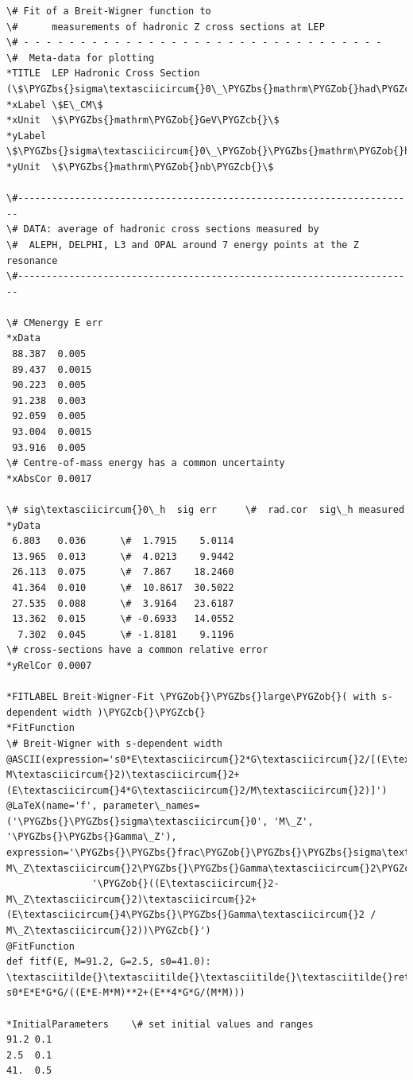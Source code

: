 \documentclass[a4paper,10pt,english]{sphinxmanual}
\def\PYGZbs{\char`\\}
\def\PYGZob{\char`\{}
\def\PYGZcb{\char`\}}
\begin{document}
\begin{Verbatim}[commandchars=\\\{\}]
\# Fit of a Breit-Wigner function to
\#      measurements of hadronic Z cross sections at LEP
\# - - - - - - - - - - - - - - - - - - - - - - - - - - - - - - - -
\#  Meta-data for plotting
*TITLE  LEP Hadronic Cross Section (\$\PYGZbs{}sigma\textasciicircum{}0\_\PYGZbs{}mathrm\PYGZob{}had\PYGZcb{}\$)
*xLabel \$E\_CM\$
*xUnit  \$\PYGZbs{}mathrm\PYGZob{}GeV\PYGZcb{}\$
*yLabel \$\PYGZbs{}sigma\textasciicircum{}0\_\PYGZob{}\PYGZbs{}mathrm\PYGZob{}had\PYGZcb{}\PYGZcb{}\$
*yUnit  \$\PYGZbs{}mathrm\PYGZob{}nb\PYGZcb{}\$

\#----------------------------------------------------------------------
\# DATA: average of hadronic cross sections measured by
\#  ALEPH, DELPHI, L3 and OPAL around 7 energy points at the Z resonance
\#----------------------------------------------------------------------

\# CMenergy E err
*xData
 88.387  0.005
 89.437  0.0015
 90.223  0.005
 91.238  0.003
 92.059  0.005
 93.004  0.0015
 93.916  0.005
\# Centre-of-mass energy has a common uncertainty
*xAbsCor 0.0017

\# sig\textasciicircum{}0\_h  sig err     \#  rad.cor  sig\_h measured
*yData
 6.803   0.036      \#  1.7915    5.0114
 13.965  0.013      \#  4.0213    9.9442
 26.113  0.075      \#  7.867    18.2460
 41.364  0.010      \#  10.8617  30.5022
 27.535  0.088      \#  3.9164   23.6187
 13.362  0.015      \# -0.6933   14.0552
  7.302  0.045      \# -1.8181    9.1196
\# cross-sections have a common relative error
*yRelCor 0.0007

*FITLABEL Breit-Wigner-Fit \PYGZob{}\PYGZbs{}large\PYGZob{}( with s-dependent width )\PYGZcb{}\PYGZcb{}
*FitFunction
\# Breit-Wigner with s-dependent width
@ASCII(expression='s0*E\textasciicircum{}2*G\textasciicircum{}2/[(E\textasciicircum{}2-M\textasciicircum{}2)\textasciicircum{}2+(E\textasciicircum{}4*G\textasciicircum{}2/M\textasciicircum{}2)]')
@LaTeX(name='f', parameter\_names=('\PYGZbs{}\PYGZbs{}sigma\textasciicircum{}0', 'M\_Z', '\PYGZbs{}\PYGZbs{}Gamma\_Z'),
expression='\PYGZbs{}\PYGZbs{}frac\PYGZob{}\PYGZbs{}\PYGZbs{}sigma\textasciicircum{}0\PYGZbs{}\PYGZbs{}, M\_Z\textasciicircum{}2\PYGZbs{}\PYGZbs{}Gamma\textasciicircum{}2\PYGZcb{}'
               '\PYGZob{}((E\textasciicircum{}2-M\_Z\textasciicircum{}2)\textasciicircum{}2+(E\textasciicircum{}4\PYGZbs{}\PYGZbs{}Gamma\textasciicircum{}2 / M\_Z\textasciicircum{}2))\PYGZcb{}')
@FitFunction
def fitf(E, M=91.2, G=2.5, s0=41.0):
\textasciitilde{}\textasciitilde{}\textasciitilde{}\textasciitilde{}return s0*E*E*G*G/((E*E-M*M)**2+(E**4*G*G/(M*M)))

*InitialParameters    \# set initial values and ranges
91.2 0.1
2.5  0.1
41.  0.5
\end{Verbatim}
\end{document}
